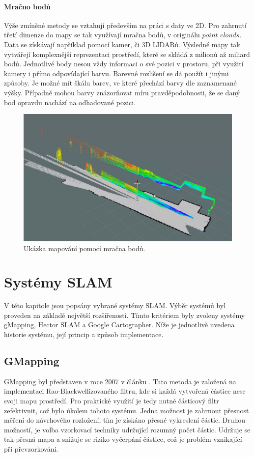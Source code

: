 \documentclass[12pt]{report}
\begin{document}
\subsubsection{Mračno bodů}
Výše zmíněné metody se vztahují především na práci s daty ve 2D. Pro zahrnutí třetí dimenze do mapy se tak využívají mračna bodů, v originálu $point$ $clouds$. Data se získávají například pomocí kamer, či 3D LIDARů. Výsledné mapy tak vytvářejí komplexnější reprezentaci prostředí, které se skládá z milionů až miliard bodů. Jednotlivé body nesou vždy informaci o své pozici v prostoru, při využití kamery i přímo odpovídající barvu. Barevné rozlišení se dá použít i jinými způsoby. Je možné mít škálu barev, ve které přechází barvy dle zaznamenané výšky. Případně mohou barvy znázorňovat míru pravděpodobnosti, že se daný bod opravdu nachází na odhadované pozici.

\begin{figure}[!ht]
	\begin{center}
		\includegraphics[width=0.6\columnwidth]{imgs/point_cloud.png}
	\end{center}
	\caption{Ukázka mapování pomocí mračna bodů.}
	\label{fig:point_cloud}
\end{figure}

\newpage
\chapter{Systémy SLAM}
V této kapitole jsou popsány vybrané systémy SLAM. Výběr systémů byl proveden na základě největší rozšířenosti. Tímto kritériem byly zvoleny systémy gMapping, Hector SLAM a Google Cartographer. Níže je jednotlivě uvedena historie systému, její princip a způsob implementace.

\section{GMapping}
GMapping byl představen v roce 2007 v článku \cite{Grisetti2007}. Tato metoda je založená na implementaci Rao-Blackwellizovaného filtru, kde si každá vytvořená částice nese svoji mapu prostředí. Pro praktické využití je tedy nutné částicový filtr zefektivnit, což bylo úkolem tohoto systému. Jedna možnost je zahrnout přesnost měření do návrhového rozložení, tím je získáno přesné vykreslení částic. Druhou možností, je volba vzorkovací techniky udržující rozumný počet částic. Udržuje se tak přesná mapa a snižuje se riziko vyčerpání částice, což je problém vznikající při převzorkování.\\
\end{document}
